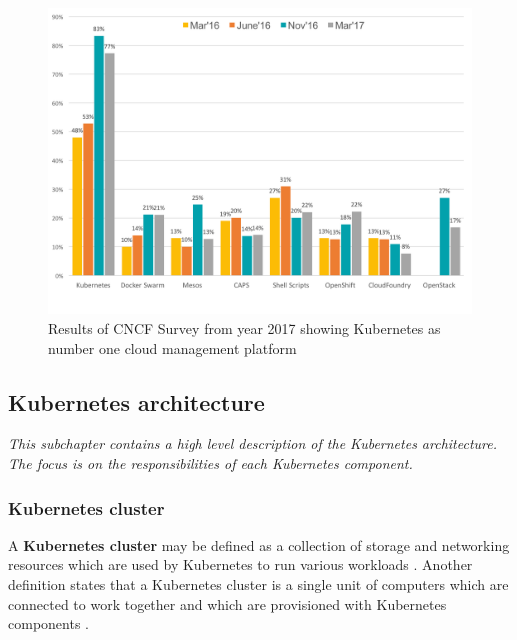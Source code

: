 \begin{figure}[H]
    \centering
    \includegraphics[width=14cm]{figures/cncf-container-orchestrators.png}
    \captionsetup{justification=centering,margin=2cm}
    \caption{Results of CNCF Survey from year 2017 showing Kubernetes as number one cloud management platform \cite{cncf-2017}}
    \label{fig:cncf-con}
\end{figure}



\subsection{Kubernetes architecture}
\textit{This subchapter contains a high level description of the Kubernetes architecture. The focus is on the responsibilities of each Kubernetes component.}

\subsubsection{Kubernetes cluster}
A \textbf{Kubernetes cluster} may be defined as a collection of storage and networking resources which are used by Kubernetes to run various workloads \cite{book-mastering-k8s}. Another definition states that a Kubernetes cluster is a single unit of computers which are connected to work together and which are provisioned with Kubernetes components \cite{k8s-cluster}.

